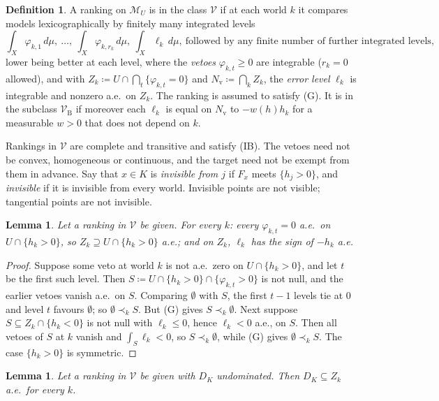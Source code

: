 \documentclass[11pt]{article}
\newcommand{\M}{\mathcal{M}}
\newcommand{\VBB}{\mathcal{V}_{\mathrm B}}
\newcommand{\VV}{\mathcal{V}}
\theoremstyle{plain}
\newtheorem{lemma}[theorem]{Lemma}
\theoremstyle{definition}
\newtheorem{definition}[theorem]{Definition}
\theoremstyle{remark}
\begin{document}
\begin{definition}\label{def:VB}
A ranking on $\M_U$ is in the class $\VV$ if at each world $k$ it compares models
lexicographically by finitely many integrated levels
\[
  \int_X\varphi_{k,1}\,d\mu,\ \dots,\ \int_X\varphi_{k,r_k}\,d\mu,\ \int_X\ell_k\,d\mu,\
  \text{followed by any finite number of further integrated levels},
\]
lower being better at each level, where the \emph{vetoes} $\varphi_{k,t}\ge0$ are
integrable ($r_k=0$ allowed), and with $Z_k\coloneqq U\cap\bigcap_t\{\varphi_{k,t}=0\}$
and $N_{\mathrm v}\coloneqq\bigcap_kZ_k$, the \emph{error level} $\ell_k$ is integrable
and nonzero a.e.\ on $Z_k$. The ranking is assumed to satisfy (G). It is in the subclass
$\VBB$ if moreover each $\ell_k$ is equal on $N_{\mathrm v}$ to $-w(h)h_k$ for a
measurable $w>0$ that does not depend on $k$.
\end{definition}

Rankings in $\VV$ are complete and transitive and satisfy (IB). The vetoes need not be
convex, homogeneous or continuous, and the target need not be exempt from them in
advance. Say that $x\in K$ is \emph{invisible from $j$} if $F_x$ meets $\{h_j>0\}$, and
\emph{invisible} if it is invisible from every world. Invisible points are not visible;
tangential points are not invisible.

\begin{lemma}\label{lem:V1a}
Let a ranking in $\VV$ be given. For every $k$: every $\varphi_{k,t}=0$ a.e.\ on $U\cap
\{h_k>0\}$, so $Z_k\supseteq U\cap\{h_k>0\}$ a.e.; and on $Z_k$, $\ell_k$ has the sign of
$-h_k$ a.e.
\end{lemma}

\begin{proof}
Suppose some veto at world $k$ is not a.e.\ zero on $U\cap\{h_k>0\}$, and let $t$ be the
first such level. Then $S\coloneqq U\cap\{h_k>0\}\cap\{\varphi_{k,t}>0\}$ is not null, and
the earlier vetoes vanish a.e.\ on $S$. Comparing $\emptyset$ with $S$, the first $t-1$
levels tie at $0$ and level $t$ favours $\emptyset$; so $\emptyset\prec_kS$. But (G) gives
$S\prec_k\emptyset$. Next suppose $S\subseteq Z_k\cap\{h_k<0\}$ is not null with
$\ell_k\le0$, hence $\ell_k<0$ a.e., on $S$. Then all vetoes of $S$ at $k$ vanish and
$\int_S\ell_k<0$, so $S\prec_k\emptyset$, while (G) gives $\emptyset\prec_kS$. The case
$\{h_k>0\}$ is symmetric.
\end{proof}

\begin{lemma}\label{lem:V2}
Let a ranking in $\VV$ be given with $D_K$ undominated. Then $D_K\subseteq Z_k$ a.e.\ for
every $k$.
\end{lemma}
\end{document}
